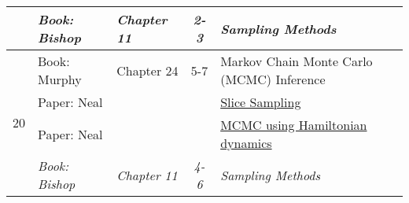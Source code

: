 \documentclass[12pt]{article}
\begin{document}
{\begin{table}
\begin{center}
\begin{tabular}{| c | l | l | c | p{6 cm} |}
                               & \textit{Book: Bishop} & \textit{Chapter 11} & \textit{2-3} & \textit{Sampling Methods} \\
            \hline
            \multirow{4}{*}{20} & Book: Murphy & Chapter 24 & 5-7 & Markov Chain Monte Carlo (MCMC) Inference \\
                               & Paper: Neal & & & \href{http://web-static-aws.seas.harvard.edu/courses/cs281/papers/neal-2001.pdf}{Slice Sampling} \\
                               & Paper: Neal & & & \href{http://web-static-aws.seas.harvard.edu/courses/cs281/papers/neal-2010.pdf}{MCMC using Hamiltonian dynamics} \\
                               & \textit{Book: Bishop} & \textit{Chapter 11} & \textit{4-6} & \textit{Sampling Methods} \\
            \hline
        \end{tabular}
    \end{center}
    \end{table}

}
\end{document}
